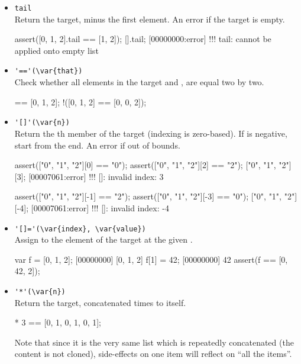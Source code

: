 \begin{itemize}
\item \lstinline|tail|\\
  Return the target, minus the first element. An error if the target
  is empty.

\begin{urbiscript}
assert([0, 1, 2].tail == [1, 2]);
[].tail;
[00000000:error] !!! tail: cannot be applied onto empty list
\end{urbiscript}

\item \lstinline|'=='(\var{that})|\\
Check whether all elements in the target and , are
equal two by two.

\begin{urbiassert}
[0, 1, 2] == [0, 1, 2];
!([0, 1, 2] == [0, 0, 2]);
\end{urbiassert}

\item \lstinline|'[]'(\var{n})|\\
  Return the th member of the target (indexing is
  zero-based). If  is negative, start from the end.  An error
  if out of bounds.

\begin{urbiscript}
assert(["0", "1", "2"][0] == "0");
assert(["0", "1", "2"][2] == "2");
["0", "1", "2"][3];
[00007061:error] !!! []: invalid index: 3

assert(["0", "1", "2"][-1] == "2");
assert(["0", "1", "2"][-3] == "0");
["0", "1", "2"][-4];
[00007061:error] !!! []: invalid index: -4
\end{urbiscript}

\item \lstinline|'[]='(\var{index}, \var{value})|\\
  Assign  to the element of the target at the given
  .

\begin{urbiscript}
var f = [0, 1, 2];
[00000000] [0, 1, 2]
f[1] = 42;
[00000000] 42
assert(f == [0, 42, 2]);
\end{urbiscript}

\item \lstinline|'*'(\var{n})|\\
  Return the target, concatenated  times to itself.
\begin{urbiassert}
[0, 1] * 3 == [0, 1, 0, 1, 0, 1];
\end{urbiassert}

  Note that since it is the very same list which is repeatedly
  concatenated (the content is not cloned), side-effects on one item
  will reflect on ``all the items''.


\end{itemize}
